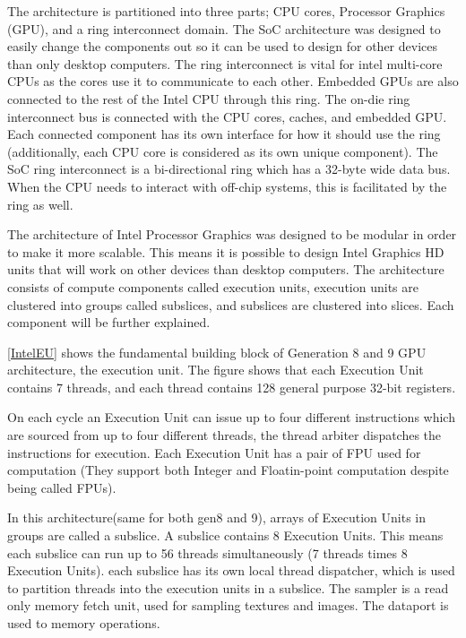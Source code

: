 The architecture is partitioned into three parts; \gls{CPU} cores, Processor Graphics (\gls{GPU}), and a ring interconnect domain. 
The \gls{SoC} architecture was designed to easily change the components out so it can be used to design for other devices than only desktop computers.
The ring interconnect is vital for intel multi-core \glspl{CPU} as the cores use it to communicate to each other. 
Embedded \glspl{GPU} are also connected to the rest of the Intel \gls{CPU} through this ring.
The on-die ring interconnect bus is connected with the \gls{CPU} cores, caches, and embedded \gls{GPU}. 
Each connected component has its own interface for how it should use the ring (additionally, each \gls{CPU} core is considered as its own unique component). 
The \gls{SoC} ring interconnect is a bi-directional ring which has a 32-byte wide data bus.  
When the \gls{CPU} needs to interact with off-chip systems, this is facilitated by the ring as well. 

The architecture of Intel Processor Graphics was designed to be modular in order to make it more scalable. 
This means it is possible to design Intel Graphics HD units that will work on other devices than desktop computers. 
The architecture consists of compute components called execution units, execution units are clustered into groups called subslices, and subslices are clustered into slices. 
Each component will be further explained.


\ref{IntelEU} shows the fundamental building block of Generation 8 and 9 \gls{GPU} architecture, the execution unit. 
The figure shows that each Execution Unit contains 7 threads, and each thread contains 128 general purpose 32-bit registers.  

On each cycle an Execution Unit can issue up to four different instructions which are sourced from up to four different threads, the thread arbiter dispatches the instructions for execution.
Each Execution Unit has a pair of \gls{FPU} used for computation (They support both Integer and Floatin-point computation despite being called FPUs).

In this architecture(same for both gen8 and 9), arrays of Execution Units in groups are called a subslice. A subslice contains 8 Execution Units. 
This means each subslice can run up to 56 threads simultaneously (7 threads times 8 Execution Units). 
each subslice has its own local thread dispatcher, which is used to partition threads into the execution units in a subslice.
The sampler is a read only memory fetch unit, used for sampling textures and images.
The dataport is used to memory operations.

